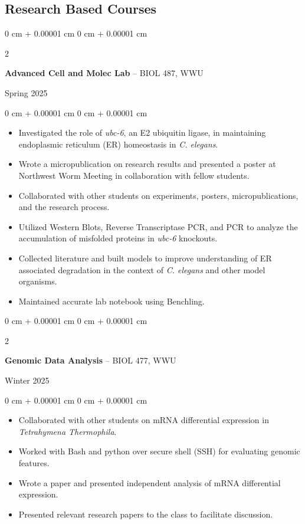 \documentclass[10pt, article]{article}
\newenvironment{highlights}{
    \begin{itemize}[
        topsep=0.10 cm,
        parsep=0.10 cm,
        partopsep=0pt,
        itemsep=0pt,
        leftmargin=0 cm + 10pt
    ]
}{
    \end{itemize}
} %
\newenvironment{onecolentry}{
    \begin{adjustwidth}{
        0 cm + 0.00001 cm
    }{
        0 cm + 0.00001 cm
    }
}{
    \end{adjustwidth}
} %
\newenvironment{twocolentry}[2][]{
    \onecolentry
    \def\secondColumn{#2}
    \setcolumnwidth{\fill, 4.5 cm}
    \begin{paracol}{2}
}{
    \switchcolumn \raggedleft \secondColumn
    \end{paracol}
    \endonecolentry
} %
\begin{document}
    \begin{samepage}

    \section{Research Based Courses}

    \begin{twocolentry}
      {Spring 2025}
      \textbf{Advanced Cell and Molec Lab} -- BIOL 487, WWU
    \end{twocolentry}
      \begin{onecolentry}
        \begin{highlights}
        \item Investigated the role of \textit{ubc-6}, an E2 ubiquitin ligase, in maintaining endoplasmic reticulum (ER) homeostasis in \textit{C. elegans}. 
        \item Wrote a micropublication on research results and presented a poster at Northwest Worm Meeting in collaboration with fellow students.
        \item Collaborated with other students on experiments, posters, micropublications, and the research process.
        \item Utilized Western Blots, Reverse Transcriptase PCR, and PCR to analyze the accumulation of misfolded proteins in \textit{ubc-6} knockouts.
        \item Collected literature and built models to improve understanding of ER associated degradation in the context of \textit{C. elegans} and other model organisms.
        \item Maintained accurate lab notebook using Benchling.
        \end{highlights}
      \end{onecolentry}

    \begin{twocolentry}
      {Winter 2025}
       \textbf{Genomic Data Analysis} -- BIOL 477, WWU
    \end{twocolentry}
      \begin{onecolentry}
        \begin{highlights}
        \item Collaborated with other students on mRNA differential expression in \textit{Tetrahymena Thermophila}.
        \item Worked with Bash and python over secure shell (SSH) for evaluating genomic features.
        \item Wrote a paper and presented independent analysis of mRNA differential expression.
        \item Presented relevant research papers to the class to facilitate discussion.
        \end{highlights}
      \end{onecolentry}


\end{samepage}
\end{document}
